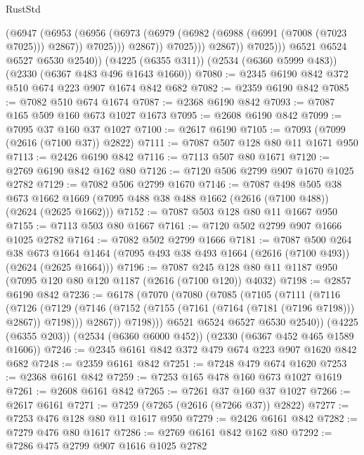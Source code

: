 \begin{lexlean}{RustStd}
\begin{coremodule}
                        (@6947
                          (@6953
                            (@6956
                              (@6973
                                (@6979 (@6982 (@6988 (@6991 (@7008 (@7023 @7025))) @2867)) @7025)))
                            @2867))
                        @7025)))
                  @2867))
              @7025)))
        @6521
        @6524
        @6527
        @6530
        @2540))
    (@4225 (@6355 @311))
    (@2534 (@6360 @5999 @483))
    (@2330 (@6367 @483 @496 @1643 @1660))
@7080 := @2345 @6190 @842 @372 @510 @674 @223 @907 @1674 @842 @682
@7082 := @2359 @6190 @842
@7085 := @7082 @510 @674 @1674
@7087 := @2368 @6190 @842
@7093 := @7087 @165 @509 @160 @673 @1027 @1673
@7095 := @2608 @6190 @842
@7099 := @7095 @37 @160 @37 @1027
@7100 := @2617 @6190
@7105 := @7093 (@7099 (@2616 (@7100 @37)) @2822)
@7111 := @7087 @507 @128 @80 @11 @1671 @950
@7113 := @2426 @6190 @842
@7116 := @7113 @507 @80 @1671
@7120 := @2769 @6190 @842 @162 @80
@7126 := @7120 @506 @2799 @907 @1670 @1025 @2782
@7129 := @7082 @506 @2799 @1670
@7146 := @7087
    @498
    @505
    @38
    @673
    @1662
    @1669
    (@7095 @488 @38 @488 @1662 (@2616 (@7100 @488)) (@2624 (@2625 @1662)))
@7152 := @7087 @503 @128 @80 @11 @1667 @950
@7155 := @7113 @503 @80 @1667
@7161 := @7120 @502 @2799 @907 @1666 @1025 @2782
@7164 := @7082 @502 @2799 @1666
@7181 := @7087
    @500
    @264
    @38
    @673
    @1664
    @1464
    (@7095 @493 @38 @493 @1664 (@2616 (@7100 @493)) (@2624 (@2625 @1664)))
@7196 := @7087 @245 @128 @80 @11 @1187 @950 (@7095 @120 @80 @120 @1187 (@2616 (@7100 @120)) @4032)
@7198 := @2857 @6190 @842
@7236 := @6178
    (@7070
      (@7080
        (@7085
          (@7105
            (@7111
              (@7116
                (@7126
                  (@7129 (@7146 (@7152 (@7155 (@7161 (@7164 (@7181 (@7196 @7198))) @2867)) @7198)))
                  @2867))
              @7198)))
        @6521
        @6524
        @6527
        @6530
        @2540))
    (@4225 (@6355 @203))
    (@2534 (@6360 @6000 @452))
    (@2330 (@6367 @452 @465 @1589 @1606))
@7246 := @2345 @6161 @842 @372 @479 @674 @223 @907 @1620 @842 @682
@7248 := @2359 @6161 @842
@7251 := @7248 @479 @674 @1620
@7253 := @2368 @6161 @842
@7259 := @7253 @165 @478 @160 @673 @1027 @1619
@7261 := @2608 @6161 @842
@7265 := @7261 @37 @160 @37 @1027
@7266 := @2617 @6161
@7271 := @7259 (@7265 (@2616 (@7266 @37)) @2822)
@7277 := @7253 @476 @128 @80 @11 @1617 @950
@7279 := @2426 @6161 @842
@7282 := @7279 @476 @80 @1617
@7286 := @2769 @6161 @842 @162 @80
@7292 := @7286 @475 @2799 @907 @1616 @1025 @2782

\end{coremodule}
\end{lexlean}
